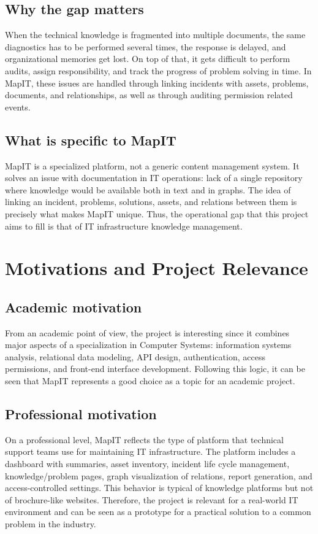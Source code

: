 \subsection{Why the gap matters}
When the technical knowledge is fragmented into multiple documents, the same diagnostics has to be performed several times, the response is delayed, and organizational memories get lost. On top of that, it gets difficult to perform audits, assign responsibility, and track the progress of problem solving in time. In MapIT, these issues are handled through linking incidents with assets, problems, documents, and relationships, as well as through auditing permission related events.
\subsection{What is specific to MapIT}
MapIT is a specialized platform, not a generic content management system. It solves an issue with documentation in IT operations: lack of a single repository where knowledge would be available both in text and in graphs. The idea of linking an incident, problems, solutions, assets, and relations between them is precisely what makes MapIT unique. Thus, the operational gap that this project aims to fill is that of IT infrastructure knowledge management.
\section{Motivations and Project Relevance}
\subsection{Academic motivation}
From an academic point of view, the project is interesting since it combines major aspects of a specialization in Computer Systems: information systems analysis, relational data modeling, API design, authentication, access permissions, and front-end interface development. Following this logic, it can be seen that MapIT represents a good choice as a topic for an academic project.
\subsection{Professional motivation}
On a professional level, MapIT reflects the type of platform that technical support teams use for maintaining IT infrastructure. The platform includes a dashboard with summaries, asset inventory, incident life cycle management, knowledge/problem pages, graph visualization of relations, report generation, and access-controlled settings. This behavior is typical of knowledge platforms but not of brochure-like websites. Therefore, the project is relevant for a real-world IT environment and can be seen as a prototype for a practical solution to a common problem in the industry.
